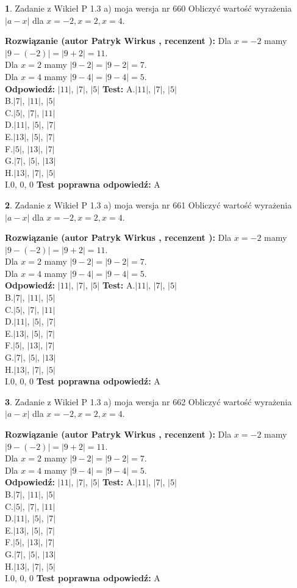 \documentclass[12pt, a4paper]{article}
\theoremstyle{definition} %
\newtheorem{zad}{}
\newcommand{\zadStart}[1]{\begin{zad}#1\newline}
\newcommand{\zadStop}{\end{zad}}
\newcommand{\rozwStart}[2]{\noindent \textbf{Rozwiązanie (autor #1 , recenzent #2): }\newline}
\newcommand{\rozwStop}{\newline}
\newcommand{\odpStart}{\noindent \textbf{Odpowiedź:}\newline}
\newcommand{\odpStop}{\newline}
\newcommand{\testStart}{\noindent \textbf{Test:}\newline}
\newcommand{\testStop}{\newline}
\newcommand{\kluczStart}{\noindent \textbf{Test poprawna odpowiedź:}\newline}
\newcommand{\kluczStop}{\newline}
\begin{document}
\zadStart{Zadanie z Wikieł P 1.3 a) moja wersja nr 660}
Obliczyć wartość wyrażenia $|a - x|$ dla $x=-2,x=2,x=4$.
\zadStop
\rozwStart{Patryk Wirkus}{}
Dla $x = -2$ mamy $|9 - (-2)| = |9 + 2| = 11$.\\
Dla $x = 2$ mamy $|9 - 2| = |9 - 2| = 7$.\\
Dla $x = 4$ mamy $|9 - 4| = |9 - 4| = 5$.\\
\rozwStop
\odpStart
$|11|$, $|7|$, $|5|$
\odpStop
\testStart
A.$|11|$, $|7|$, $|5|$\\
B.$|7|$, $|11|$, $|5|$\\
C.$|5|$, $|7|$, $|11|$\\
D.$|11|$, $|5|$, $|7|$\\
E.$|13|$, $|5|$, $|7|$\\
F.$|5|$, $|13|$, $|7|$\\
G.$|7|$, $|5|$, $|13|$\\
H.$|13|$, $|7|$, $|5|$\\
I.$0$, $0$, $0$
\testStop
\kluczStart
A
\kluczStop



\zadStart{Zadanie z Wikieł P 1.3 a) moja wersja nr 661}
Obliczyć wartość wyrażenia $|a - x|$ dla $x=-2,x=2,x=4$.
\zadStop
\rozwStart{Patryk Wirkus}{}
Dla $x = -2$ mamy $|9 - (-2)| = |9 + 2| = 11$.\\
Dla $x = 2$ mamy $|9 - 2| = |9 - 2| = 7$.\\
Dla $x = 4$ mamy $|9 - 4| = |9 - 4| = 5$.\\
\rozwStop
\odpStart
$|11|$, $|7|$, $|5|$
\odpStop
\testStart
A.$|11|$, $|7|$, $|5|$\\
B.$|7|$, $|11|$, $|5|$\\
C.$|5|$, $|7|$, $|11|$\\
D.$|11|$, $|5|$, $|7|$\\
E.$|13|$, $|5|$, $|7|$\\
F.$|5|$, $|13|$, $|7|$\\
G.$|7|$, $|5|$, $|13|$\\
H.$|13|$, $|7|$, $|5|$\\
I.$0$, $0$, $0$
\testStop
\kluczStart
A
\kluczStop



\zadStart{Zadanie z Wikieł P 1.3 a) moja wersja nr 662}
Obliczyć wartość wyrażenia $|a - x|$ dla $x=-2,x=2,x=4$.
\zadStop
\rozwStart{Patryk Wirkus}{}
Dla $x = -2$ mamy $|9 - (-2)| = |9 + 2| = 11$.\\
Dla $x = 2$ mamy $|9 - 2| = |9 - 2| = 7$.\\
Dla $x = 4$ mamy $|9 - 4| = |9 - 4| = 5$.\\
\rozwStop
\odpStart
$|11|$, $|7|$, $|5|$
\odpStop
\testStart
A.$|11|$, $|7|$, $|5|$\\
B.$|7|$, $|11|$, $|5|$\\
C.$|5|$, $|7|$, $|11|$\\
D.$|11|$, $|5|$, $|7|$\\
E.$|13|$, $|5|$, $|7|$\\
F.$|5|$, $|13|$, $|7|$\\
G.$|7|$, $|5|$, $|13|$\\
H.$|13|$, $|7|$, $|5|$\\
I.$0$, $0$, $0$
\testStop
\kluczStart
A
\kluczStop
\end{document}
